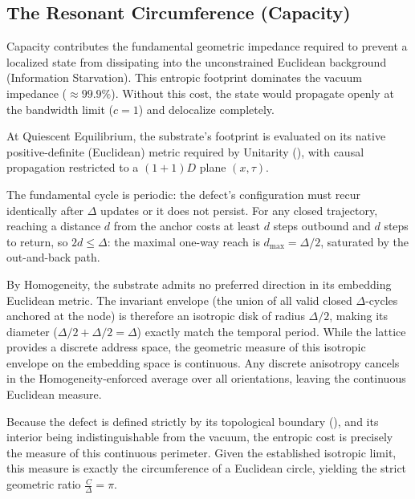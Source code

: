 \subsection{The Resonant Circumference (Capacity)}
\label{subsec:alpha_cap}
Capacity contributes the fundamental geometric impedance required to prevent a localized state from dissipating into the unconstrained Euclidean background (Information Starvation). This entropic footprint dominates the vacuum impedance ($\approx 99.9\%$). Without this cost, the state would propagate openly at the bandwidth limit ($c=1$) and delocalize completely.

At Quiescent Equilibrium, the substrate's footprint is evaluated on its native positive-definite (Euclidean) metric required by Unitarity (), with causal propagation restricted to a $(1+1)D$ plane $(x,\tau)$.

The fundamental cycle is periodic: the defect's configuration must recur identically after $\Delta$ updates or it does not persist. For any closed trajectory, reaching a distance $d$ from the anchor costs at least $d$ steps outbound and $d$ steps to return, so $2d \le \Delta$: the maximal one-way reach is $d_{\max} = \Delta/2$, saturated by the out-and-back path.

By Homogeneity, the substrate admits no preferred direction in its embedding Euclidean metric. The invariant envelope (the union of all valid closed $\Delta$-cycles anchored at the node) is therefore an isotropic disk of radius $\Delta/2$, making its diameter ($\Delta/2 + \Delta/2 = \Delta$) exactly match the temporal period. While the lattice provides a discrete address space, the geometric measure of this isotropic envelope on the embedding space is continuous. Any discrete anisotropy cancels in the Homogeneity-enforced average over all orientations, leaving the continuous Euclidean measure.

Because the defect is defined strictly by its topological boundary (), and its interior being indistinguishable from the vacuum, the entropic cost is precisely the measure of this continuous perimeter. Given the established isotropic limit, this measure is exactly the circumference of a Euclidean circle, yielding the strict geometric ratio $\frac{C}{\Delta} = \pi$.

